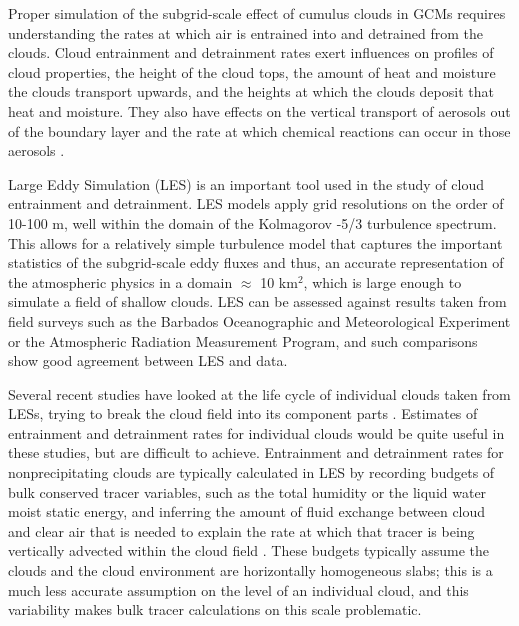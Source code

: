 \documentclass[12pt]{article}
\begin{document}
Proper simulation of the subgrid-scale effect of cumulus clouds in GCMs requires 
understanding the rates at which air is entrained into and detrained from the 
clouds. Cloud entrainment and detrainment rates exert influences on profiles of 
cloud properties, the height of the cloud tops, the amount of heat and moisture 
the clouds transport upwards, and the heights at which the clouds deposit that 
heat and moisture.  They also have effects on the vertical transport of 
aerosols out of the boundary layer and the rate at which chemical reactions can 
occur in those aerosols \citep{Barahona2007,Anldrejczuk2008}.

Large Eddy Simulation (LES) is an important tool used in the study of cloud 
entrainment and detrainment. LES models apply grid resolutions on the order 
of 10-100 m, well within the domain of the Kolmagorov -5/3 turbulence spectrum. 
This allows for a relatively simple turbulence model that captures the 
important statistics of the subgrid-scale eddy fluxes and thus, an accurate 
representation of the atmospheric physics in a domain $\approx$ 10 km$^{2}$, 
which is large enough to simulate a field of shallow clouds.  LES can be 
assessed against results taken from field surveys such as the Barbados 
Oceanographic and Meteorological Experiment \citep[BOMEX;][]{Holland1973} or 
the Atmospheric Radiation Measurement \citep[ARM;][]{Brown2002} Program, and 
such comparisons show good agreement between LES and data.

Several recent studies have looked at the life cycle of individual clouds taken 
from LESs, trying to break the cloud field into its component parts 
\citep{Zhao2005,Zhao2005a,Heus2009}.  Estimates of entrainment and detrainment 
rates for individual clouds would be quite useful in these studies, but are 
difficult to achieve. Entrainment and detrainment rates for nonprecipitating 
clouds are typically calculated in LES by recording budgets of bulk conserved 
tracer variables, such as the total humidity or the liquid water moist static 
energy, and inferring the amount of fluid exchange between cloud and clear air 
that is needed to explain the rate at which that tracer is being vertically 
advected within the cloud field \citep{Siebesma1995}. These budgets typically 
assume the clouds and the cloud environment are horizontally homogeneous slabs; 
this is a much less accurate assumption on the level of an individual cloud, and 
this variability makes bulk tracer calculations on this scale problematic.
\end{document}

